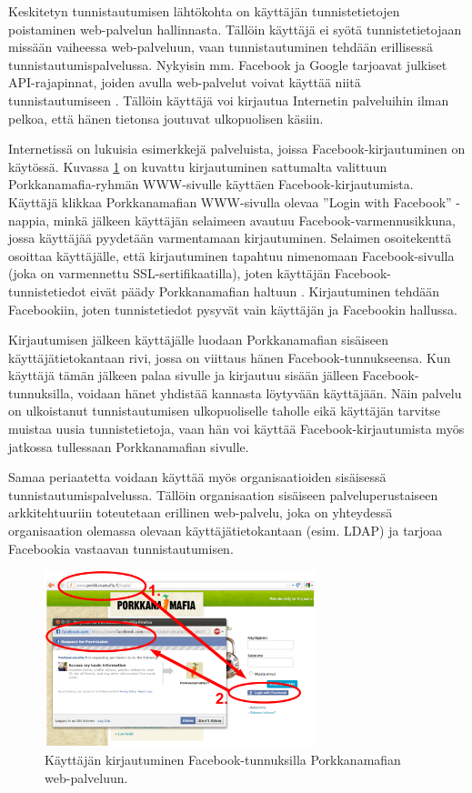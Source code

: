 Keskitetyn tunnistautumisen lähtökohta on käyttäjän tunnistetietojen poistaminen web-palvelun hallinnasta. Tällöin käyttäjä ei syötä tunnistetietojaan missään vaiheessa web-palveluun, vaan tunnistautuminen tehdään erillisessä tunnistautumispalvelussa. Nykyisin mm. Facebook ja Google tarjoavat julkiset API-rajapinnat, joiden avulla web-palvelut voivat käyttää niitä tunnistautumiseen \cite{facebook}. Tällöin käyttäjä voi kirjautua Internetin palveluihin ilman pelkoa, että hänen tietonsa joutuvat ulkopuolisen käsiin.

Internetissä on lukuisia esimerkkejä palveluista, joissa Facebook-kirjautuminen on käytössä. Kuvassa \ref{facebook_login} on kuvattu kirjautuminen sattumalta valittuun Porkkanamafia-ryhmän WWW-sivulle käyttäen Facebook-kirjautumista. Käyttäjä klikkaa Porkkanamafian WWW-sivulla olevaa ''Login with Facebook'' -nappia, minkä jälkeen käyttäjän selaimeen avautuu Facebook-varmennusikkuna, jossa käyttäjää pyydetään varmentamaan kirjautuminen. Selaimen osoitekenttä osoittaa käyttäjälle, että kirjautuminen tapahtuu nimenomaan Facebook-sivulla (joka on varmennettu SSL-sertifikaatilla), joten käyttäjän Facebook-tun\-nis\-te\-tie\-dot eivät päädy Porkkanamafian haltuun \cite{facebook}. Kirjautuminen tehdään Facebookiin, joten tunnistetiedot pysyvät vain käyttäjän ja Facebookin hallussa.

Kirjautumisen jälkeen käyttäjälle luodaan Porkkanamafian sisäiseen käyttäjätietokantaan rivi, jossa on viittaus hänen Facebook-tunnukseensa. Kun käyttäjä tämän jälkeen palaa sivulle ja kirjautuu sisään jälleen Facebook-tunnuksilla, voidaan hänet yhdistää kannasta löytyvään käyttäjään. Näin palvelu on ulkoistanut tunnistautumisen ulkopuoliselle taholle eikä käyttäjän tarvitse muistaa uusia tunnistetietoja, vaan hän voi käyttää Facebook-kirjautumista myös jatkossa tullessaan Porkkanamafian sivulle.

Samaa periaatetta voidaan käyttää myös organisaatioiden sisäisessä tunnistautumispalvelussa. Tällöin organisaation sisäiseen palveluperustaiseen arkkitehtuuriin toteutetaan erillinen web-palvelu, joka on yhteydessä organisaation olemassa olevaan käyttäjätietokantaan (esim. LDAP) ja tarjoaa Facebookia vastaavan tunnistautumisen.

\begin{figure}[ht]
\centering
\includegraphics[width=0.7\textwidth]{tunnistautuminen/keskitetty/facebook.eps}
\caption{Käyttäjän kirjautuminen Facebook-tunnuksilla Porkkanamafian web-palveluun.}%
\label{facebook_login}
\end{figure}